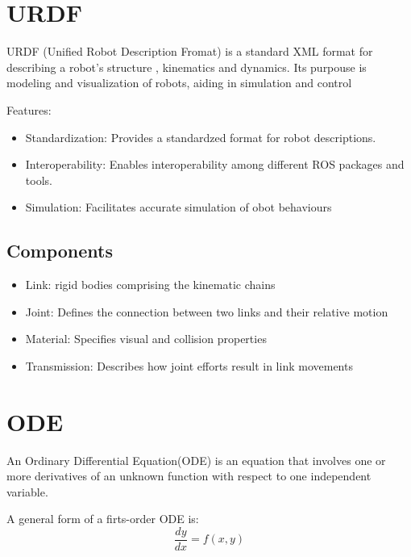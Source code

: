 \section{URDF}
{
    URDF (Unified Robot Description Fromat) is a standard XML format for describing a robot's structure , kinematics and dynamics.
    Its purpouse is modeling and visualization of robots, aiding in simulation and control
}

Features:
\begin{itemize}
        \item Standardization: Provides a standardzed format for robot descriptions.
        \item Interoperability: Enables interoperability among different ROS packages and tools.
        \item Simulation: Facilitates accurate simulation of obot behaviours
        
\end{itemize}

\subsection{Components}
\begin{itemize}
        \item Link: rigid bodies comprising the kinematic chains
        \item Joint: Defines the connection between two links and their relative motion
        \item Material: Specifies visual and collision properties
        \item Transmission: Describes how joint efforts result in link movements
        
\end{itemize}





\section{ODE}

{
    An Ordinary Differential Equation(ODE) is an equation that involves one or more derivatives of an unknown function with respect to one independent variable.
}

\ex{}
{
    A general form of a firts-order ODE is:
    \begin{equation}
        \frac{dy}{dx} = f(x,y)
    \end{equation}
}

